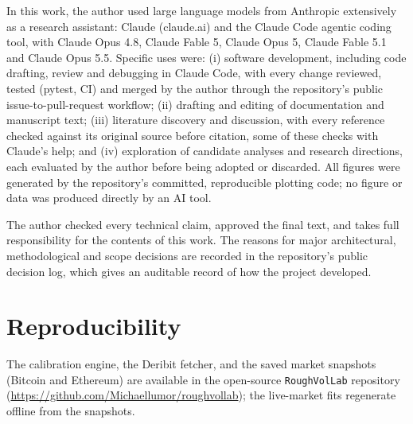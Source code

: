 \documentclass[11pt]{article}
\begin{document}
In this work, the author used large language models from Anthropic extensively as a research
assistant: Claude (claude.ai) and the Claude Code agentic coding tool, with Claude Opus 4.8,
Claude Fable 5, Claude Opus 5, Claude Fable 5.1 and Claude Opus 5.5. Specific uses were:
(i) software development, including code drafting, review and debugging in Claude Code, with
every change reviewed, tested (pytest, CI) and merged by the author through the repository's
public issue-to-pull-request workflow; (ii) drafting and editing of documentation and
manuscript text; (iii) literature discovery and discussion, with every reference checked
against its original source before citation, some of these checks with Claude's help; and
(iv) exploration of candidate analyses and research directions, each evaluated by the author
before being adopted or discarded. All figures were generated by the repository's committed,
reproducible plotting code; no figure or data was produced directly by an AI tool.

The author checked every technical claim, approved the final text, and takes full
responsibility for the contents of this work. The reasons for major architectural,
methodological and scope decisions are recorded in the repository's public decision log,
which gives an auditable record of how the project developed.

\section*{Reproducibility}
The calibration engine, the Deribit fetcher, and the saved market snapshots (Bitcoin and
Ethereum) are available in the open-source \texttt{RoughVolLab} repository
(\url{https://github.com/Michaellumor/roughvollab}); the live-market fits regenerate offline
from the snapshots.
\end{document}
